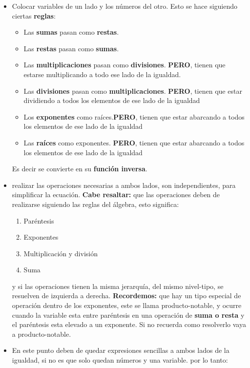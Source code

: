 \begin{itemize}
    \item Colocar variables de un lado y los  números del otro. Esto se hace
        siguiendo ciertas \textbf{reglas}:
        \begin{itemize}
            \item Las \textbf{sumas} pasan como \textbf{restas}.
            \item Las \textbf{restas} pasan como \textbf{sumas}.
            \item Las \textbf{multiplicaciones} pasan como \textbf{divisiones}.
                \textbf{PERO}, tienen que estarse multiplicando a todo ese lado
                de la igualdad.
            \item Las \textbf{divisiones} pasan como \textbf{multiplicaciones}.
                \textbf{PERO}, tienen que estar dividiendo a todos los elementos
                de ese lado de la igualdad
            \item Los \textbf{exponentes} como raíces.\textbf{PERO}, tienen que
                estar abarcando a todos los elementos
                de ese lado de la igualdad
            \item Las \textbf{raíces} como exponentes. \textbf{PERO}, tienen que
                estar abarcando a todos los elementos
                de ese lado de la igualdad
        \end{itemize}
        Es decir se convierte en su \textbf{función inversa}.

    \item realizar las operaciones necesarias a ambos lados, son independientes,
        para simplificar la ecuación. \textbf{Cabe resaltar: }que las operaciones
        deben de realizarse siguiendo las reglas del álgebra, esto significa:
        \begin{enumerate}
            \item Paréntesis
            \item Exponentes
            \item Multiplicación y división
            \item Suma
        \end{enumerate}

        y si las operaciones tienen la misma jerarquía, del mismo nivel-tipo, se
        resuelven de izquierda a derecha.
        \textbf{Recordemos: } que hay un tipo especial de operación dentro de los
        exponentes, este se llama \refname{producto-notable}, y ocurre cuando la
        variable esta entre paréntesis en una operación de \textbf{suma o resta}
        y el paréntesis esta elevado a un exponente. Si no recuerda como resolverlo
        vaya a \refname{producto-notable}.
    \item En este punto deben de quedar expresiones sencillas a ambos lados de
        la igualdad, si no es que solo quedan números y una variable. por lo tanto:


\end{itemize}
